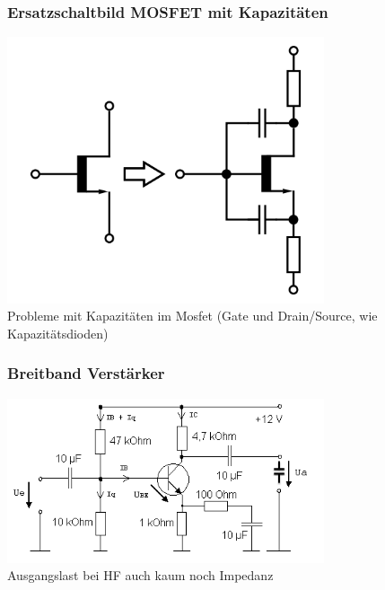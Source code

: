 \begin{frame}
  \frametitle{Ersatzschaltbild MOSFET mit Kapazitäten}
  \begin{center}
    \includegraphics[width=0.7\textwidth,height=.6\textheight,keepaspectratio]{a07/HF_Ersatzschaltbild.png}
    {\tiny \hyperlink{refs}{\cite{wm}}} \\[2em]
    Probleme mit Kapazitäten im Mosfet (Gate und Drain/Source, wie Kapazitätsdioden)
  \end{center}
\end{frame}

\begin{frame}
  \frametitle{Breitband Verstärker}
  \begin{center}
    \includegraphics[width=0.7\textwidth]{a07/Breitbandverstarker.png}
    {\tiny \hyperlink{refs}{\cite{wm}}} \\[3em]
    Ausgangslast bei HF auch kaum noch Impedanz
  \end{center}
\end{frame}

